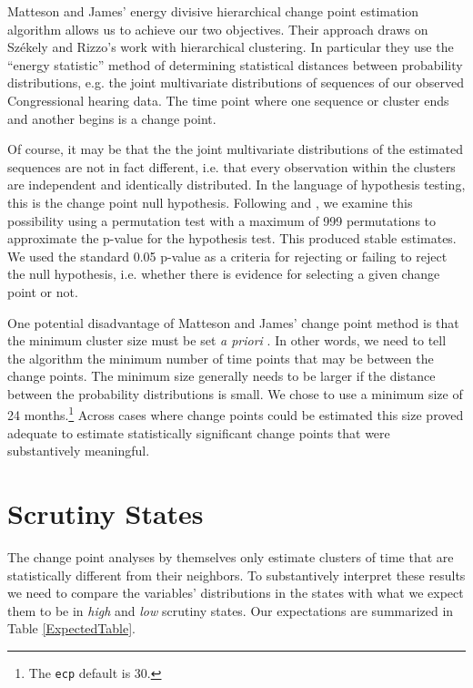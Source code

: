 \documentclass[a4paper]{article}\usepackage[]{graphicx}\usepackage[]{color}
\begin{document}
Matteson and James' \citeyearpar{Matteson2014} energy divisive hierarchical change point estimation algorithm allows us to achieve our two objectives. Their approach draws on Sz{\'e}kely and Rizzo's \citeyearpar{Szekely2005} work with hierarchical clustering. In particular they use the ``energy statistic'' method of determining statistical distances between probability distributions, e.g. the joint multivariate distributions of sequences of our observed Congressional hearing data. The time point where one sequence or cluster ends and another begins is a change point.

Of course, it may be that the the joint multivariate distributions of the estimated sequences are not in fact different, i.e. that every observation within the clusters are independent and identically distributed. In the language of hypothesis testing, this is the change point null hypothesis. Following \cite{Matteson2014} and \cite{Rizzo2010}, we examine this possibility using a permutation test with a maximum of 999 permutations to approximate the p-value for the hypothesis test. This produced stable estimates. We used the standard 0.05 p-value as a criteria for rejecting or failing to reject the null hypothesis, i.e. whether there is evidence for selecting a given change point or not.

One potential disadvantage of Matteson and James' change point method is that the minimum cluster size must be set \emph{a priori} \citeyearpar[11]{Matteson2014}. In other words, we need to tell the algorithm the minimum number of time points that may be between the change points. The minimum size generally needs to be larger if the distance between the probability distributions is small. We chose to use a minimum size of 24 months.\footnote{The \texttt{ecp} default is 30.} Across cases where change points could be estimated this size proved adequate to estimate statistically significant change points that were substantively meaningful.

\section{Scrutiny States}

The change point analyses by themselves only estimate clusters of time that are statistically different from their neighbors. To substantively interpret these results we need to compare the variables' distributions in the states with what we expect them to be in \emph{high} and \emph{low} scrutiny states. Our expectations are summarized in Table \ref{ExpectedTable}.
\end{document}

